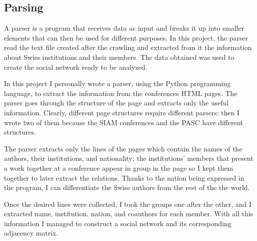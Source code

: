 \documentclass[]{usiinfbachelorproject}
\begin{document}
\subsection{Parsing}
A parser is a program that receives data as input and breaks it up into smaller elements that can then be used for different purposes. In this project, the parser read the text file created after the crawling and extracted from it the information about Swiss institutions and their members. The data obtained was used to create the social network ready to be analyzed.

In this project I personally wrote a parser, using the Python programming language, to extract the information from the conferences HTML pages. The parser goes through the structure of the page and extracts only the useful information. Clearly, different page structures require different parsers; then I wrote two of them because the SIAM conferences and the PASC have different structures.

The parser extracts only the lines of the pages which contain the names of the authors, their institutions, and nationality; the institutions' members that present a work together at a conference appear in group in the page so I kept them together to later extract the relations. Thanks to the nation being expressed in the program, I can differentiate the Swiss authors from the rest of the the world. 

Once the desired lines were collected, I took the groups one after the other, and I extracted name, institution, nation, and coauthors for each member. With all this information I managed to construct a social network and its corresponding adjacency matrix.
\end{document}
